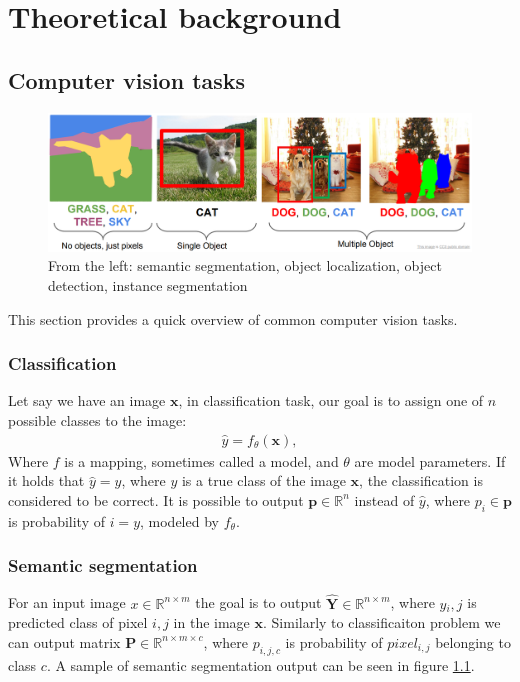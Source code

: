 \chapter{Theoretical background}
\section{Computer vision tasks}
\begin{figure}
    \centering
    \includegraphics[width=\linewidth]{images/computer_vision_tasks.png}
    \caption{From the left: semantic segmentation, object localization, object detection, instance segmentation}
    \label{fig:computer_vision_tasks}
\end{figure}
This section provides a quick overview of common computer vision tasks.
\subsection{Classification}
Let say we have an image $\mathbf{x}$, in classification task, our goal is to assign one of $n$ possible classes to the image:
\begin{align}
    \hat{y} = f_\theta\left(\mathbf{x} \right),
\end{align}
Where $f$ is a mapping, sometimes called a model, and $\theta$ are model parameters. If it holds that $\hat{y}=y$, where $y$ is a true class of the image $\mathbf{x}$, the classification is considered to be correct.
It is possible to output $\mathbf{p} \in \mathbb{R}^n$ instead of $\hat{y}$, where $p_i \in \mathbf{p}$ is probability of $i = y$, modeled by $f_\theta$.

\subsection{Semantic segmentation}
For an input image $x \in \mathbb{R}^{n \times m}$ the goal is to output $\mathbf{\hat{Y}} \in \mathbb{R}^{n \times m}$, where $y{_i,j}$ is predicted class of pixel $i,j$ in the image $\mathbf{x}$. Similarly to classificaiton problem we can output matrix $\mathbf{P} \in \mathbb{R}^{n \times m \times c}$, where $p_{i,j,c}$ is probability of $pixel_{i,j}$ belonging to class $c$. A sample of semantic segmentation output can be seen in figure \ref{fig:computer_vision_tasks}.

